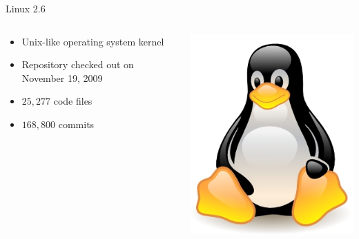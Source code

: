 \begin{frame}{Linux 2.6}
  \begin{columns}[c]
    \begin{column}{0.60\textwidth}
      \begin{itemize}
      \item Unix-like operating system kernel
      \item Repository checked out on November 19, 2009
      \item $25,277$ code files
      \item $168,800$ commits
      \end{itemize}
    \end{column}
    \begin{column}{0.40\textwidth}
      \includegraphics[width=\textwidth]{figures/linux-logo}
    \end{column}
  \end{columns}
\end{frame}

\note{
}

